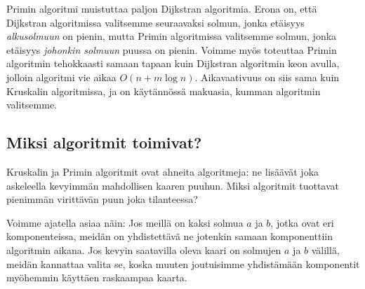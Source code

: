 Primin algoritmi muistuttaa paljon Dijkstran algoritmia.
Erona on, että Dijkstran algoritmissa valitsemme
seuraavaksi solmun, jonka etäisyys \emph{alkusolmuun} on pienin,
mutta Primin algoritmissa valitsemme solmun, jonka etäisyys
\emph{johonkin solmuun} puussa on pienin.
Voimme myös toteuttaa Primin algoritmin tehokkaasti samaan
tapaan kuin Dijkstran algoritmin keon avulla,
jolloin algoritmi vie aikaa $O(n+m \log n)$.
Aikavaativuus on siis sama kuin Kruskalin algoritmissa,
ja on käytännössä makuasia, kumman algoritmin valitsemme.

\subsection{Miksi algoritmit toimivat?}

Kruskalin ja Primin algoritmit ovat ahneita algoritmeja:
ne lisäävät joka askeleella kevyimmän mahdollisen kaaren puuhun.
Miksi algoritmit tuottavat pienimmän virittävän puun joka tilanteessa?

Voimme ajatella asiaa näin: 
Jos meillä on kaksi solmua $a$ ja $b$, jotka ovat eri komponenteissa,
meidän on yhdistettävä ne jotenkin samaan komponenttiin algoritmin aikana.
Jos kevyin saatavilla oleva kaari on solmujen $a$ ja $b$ välillä,
meidän kannattaa valita se, koska muuten joutuisimme yhdistämään komponentit
myöhemmin käyttäen raskaampaa kaarta.

